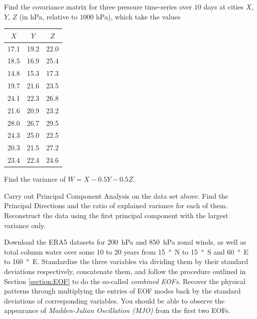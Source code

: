 \begin{Exercise}
Find the covariance matrix for three pressure time-series over $10$ days at cities $X$, $Y$, $Z$ (in hPa, relative to $1000$ hPa), which take the values
\begin{center}
\begin{tabular}{|c|c|c|}
\hline
$X$ & $Y$ & $Z$ \\
\hline
17.1 & 19.2 & 22.0 \\
\hline
18.5 & 16.9 & 25.4 \\
\hline
14.8 & 15.3 & 17.3 \\
\hline
19.7 & 21.6 & 23.5 \\
\hline
24.1 & 22.3 & 26.8 \\
\hline
21.6 & 20.9 & 23.2 \\
\hline 
28.0 & 26.7 & 29.5 \\
\hline
24.3 & 25.0 & 22.5 \\
\hline
20.3 & 21.5 & 27.2 \\
\hline
23.4 & 22.4 & 24.6 \\
\hline
\end{tabular}
\end{center}
Find the variance of $W = X - 0.5Y - 0.5Z$.
\end{Exercise}

\begin{Exercise}
Carry out Principal Component Analysis on the data set above. Find the Principal Directions and the ratio of explained variance for each of them. Reconstruct the data using the first principal component with the largest variance only.
\end{Exercise}

\begin{Exercise}
\label{ex:MJO}
Download the ERA5 datasets for \SI{200}{hPa} and \SI{850}{hPa} zonal winds, as well as total column water over some $10$ to $20$ years from \SI{15}{\degree N} to \SI{15}{\degree S} and \SI{60}{\degree E} to \SI{160}{\degree E}. Standardize the three variables via dividing them by their standard deviations respectively, concatenate them, and follow the procedure outlined in Section \ref{section:EOF} to do the so-called \textit{combined EOFs}. Recover the physical patterns through multiplying the entries of EOF modes back by the standard deviations of corresponding variables. You should be able to observe the appearance of \textit{Madden-Julian Oscillation (MJO)} from the first two EOFs. 
\end{Exercise}

